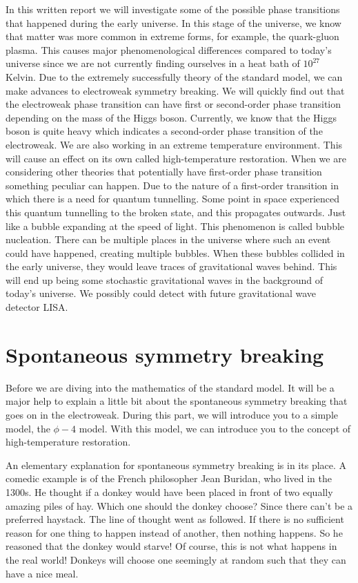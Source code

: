 \documentclass{article}
\numberwithin{equation}{section}
\begin{document}
In this written report we will investigate some of the possible phase transitions that happened during the early universe. 
In this stage of the universe, we know that matter was more common in extreme forms, for example, the quark-gluon plasma.
This causes major phenomenological differences compared to today's universe since we are not currently finding ourselves in a heat bath of $10^{27}$ Kelvin.
Due to the extremely successfully theory of the standard model, we can make advances to electroweak symmetry breaking.
We will quickly find out that the electroweak phase transition can have first or second-order phase transition depending on the mass of the Higgs boson.
Currently, we know that the Higgs boson is quite heavy which indicates a second-order phase transition of the electroweak.
We are also working in an extreme temperature environment.
This will cause an effect on its own called high-temperature restoration.
When we are considering other theories that potentially have first-order phase transition something peculiar can happen.
Due to the nature of a first-order transition in which there is a need for quantum tunnelling.
Some point in space experienced this quantum tunnelling to the broken state, and this propagates outwards. 
Just like a bubble expanding at the speed of light.
This phenomenon is called bubble nucleation.
There can be multiple places in the universe where such an event could have happened, creating multiple bubbles.
When these bubbles collided in the early universe, they would leave traces of gravitational waves behind.
This will end up being some stochastic gravitational waves in the background of today's universe.
We possibly could detect with future gravitational wave detector LISA.


\section{Spontaneous symmetry breaking}

Before we are diving into the mathematics of the standard model.
It will be a major help to explain a little bit about the spontaneous symmetry breaking that goes on in the electroweak.
During this part, we will introduce you to a simple model, the $\phi-4$ model.
With this model, we can introduce you to the concept of high-temperature restoration.

\vspace{20px}

An elementary explanation for spontaneous symmetry breaking is in its place.
A comedic example is of the French philosopher Jean Buridan, who lived in the 1300s.
He thought if a donkey would have been placed in front of two equally amazing piles of hay.
Which one should the donkey choose?
Since there can't be a preferred haystack. 
The line of thought went as followed.
If there is no sufficient reason for one thing to happen instead of another, then nothing happens.
So he reasoned that the donkey would starve!
Of course, this is not what happens in the real world! 
Donkeys will choose one seemingly at random such that they can have a nice meal.
\end{document}
